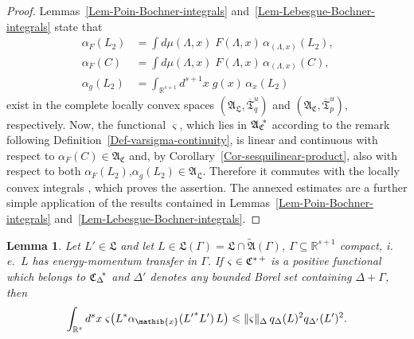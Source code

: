 \documentclass[11pt,twoside,openright]{report}
\theoremstyle{definition}
\theoremstyle{plain}
\newtheorem{Lem}[Def]{Lemma}
\theoremstyle{remark}
\theoremstyle{assumption}
\newcommand{\norm}[1]{\lVert #1 \rVert}
\newcommand{\qDx}[1]{q_\Delta ( #1 )}
\newcommand{\qDprimex}[1]{q_{\Delta'} ( #1 )}
\newcommand{\Afrak}{\mathfrak{A}}
\newcommand{\Lfrak}{\mathfrak{L}}
\newcommand{\Rs}{\mathbb{R}^s}
\newcommand{\Rsone}{\mathbb{R}^{s + 1}}
\newcommand{\Tfrakbar}{\overline{\mathfrak{T}}}
\newcommand{\AC}{\mathfrak{A}_\mathfrak{C}}
\newcommand{\AL}{\mathfrak{A}_\mathfrak{L}}
\newcommand{\ACstar}{{\mathfrak{A}_\mathfrak{C}}^{\negthickspace *}}
\newcommand{\Cstarplus}{\mathfrak{C}^{* \thinspace +}}
\newcommand{\CDstar}{{\mathfrak{C}_\Delta}^{\negthickspace *}}
\newcommand{\aLax}{\alpha_{( \Lambda , x )}}
\newcommand{\aibx}{\alpha_\mathib{x}}
\newcommand{\ax}{\alpha_x}
\begin{document}
\begin{proof}
  Lemmas~\ref{Lem-Poin-Bochner-integrals}
  and~\ref{Lem-Lebesgue-Bochner-integrals} state that
  \begin{align*}
    \alpha_F ( L_2 ) & = \int d \mu ( \Lambda , x ) \; F ( \Lambda , x
    ) \, \aLax ( L_2 ) \text{,} \\
    \alpha_F ( C ) & = \int d \mu ( \Lambda , x ) \; F ( \Lambda , x )
    \, \aLax ( C ) \text{,} \\
    \alpha_g ( L_2 ) & = \int_{\Rsone} d^{s + 1} x \; g ( x ) \,
    \ax ( L_2 )
  \end{align*}
  exist in the complete locally convex spaces $( \AL , \Tfrakbar^u_q
  )$ and $( \AC , \Tfrakbar^u_p )$, respectively. Now, the functional
  $\varsigma$, which lies in $\ACstar$ according to the remark
  following Definition~\ref{Def-varsigma-continuity}, is linear and
  continuous with respect to $\alpha_F ( C ) \in \AC$ and, by
  Corollary~\ref{Cor-sesquilinear-product}, also with respect to both
  $\alpha_F ( L_2 ) \text{,} \alpha_g ( L_2 ) \in \AL$. Therefore it
  commutes with the locally convex integrals \cite[Proposition~II.5.7
  adapted to integrals in locally convex spaces]{fell/doran:1988a},
  which proves the assertion. The annexed estimates are a further
  simple application of the results contained in
  Lemmas~\ref{Lem-Poin-Bochner-integrals}
  and~\ref{Lem-Lebesgue-Bochner-integrals}.
\end{proof}
\begin{Lem}
  \label{Lem-cluster-prep}
  Let $L' \in \Lfrak$ and let $L \in \Lfrak ( \Gamma ) = \Lfrak \cap
  \widetilde{\Afrak} ( \Gamma )$, $\Gamma \subseteq \Rsone$ compact,
  i.\,e.~$L$ has energy-momentum transfer in $\Gamma$. If $\varsigma
  \in \Cstarplus$ is a positive functional which belongs to $\CDstar$
  and $\Delta'$ denotes any bounded Borel set containing $\Delta +
  \Gamma$, then
  \begin{equation}
    \label{eq-varsigmaintegral-prep}
    \int_{\Rs} d^s x \; \varsigma \bigl( L^* \aibx ( {L'}^* L' ) \, L
    \bigr) \leqslant \norm{\varsigma}_\Delta \, \qDx{L}^2
    \qDprimex{L'}^2 \text{.}
  \end{equation}
\end{Lem}
\end{document}
